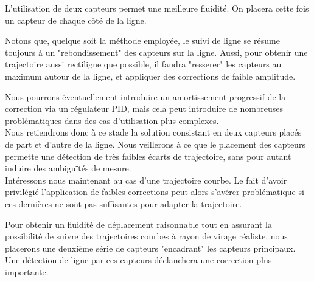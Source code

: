 
		L'utilisation de deux capteurs permet une meilleure fluidité. On placera cette fois un capteur de chaque côté de la ligne.


		Notons que, quelque soit la méthode employée, le suivi de ligne se résume toujours à un "rebondissement" des capteurs sur la ligne. Aussi, pour obtenir une trajectoire aussi rectiligne que possible, il faudra "resserer" les capteurs au maximum autour de la ligne, et appliquer des corrections de faible amplitude.


		Nous pourrons éventuellement introduire un amortissement progressif de la correction via un régulateur PID, mais cela peut introduire de nombreuses problématiques dans des cas d'utilisation plus complexes.\\

		Nous retiendrons donc à ce stade la solution consistant en deux capteurs placés de part et d'autre de la ligne. Nous veillerons à ce que le placement des capteurs permette une détection de très faibles écarts de trajectoire, sans pour autant induire des ambiguïtés de mesure.\\

		Intéressons nous maintenant au cas d'une trajectoire courbe. Le fait d'avoir privilégié l'application de faibles corrections peut alors s'avérer problématique si ces dernières ne sont pas suffisantes pour adapter la trajectoire.


		Pour obtenir un fluidité de déplacement raisonnable tout en assurant la possibilité de suivre des trajectoires courbes à rayon de virage réaliste, nous placerons une deuxième série de capteurs "encadrant" les capteurs principaux. Une détection de ligne par ces capteurs déclanchera une correction plus importante.


